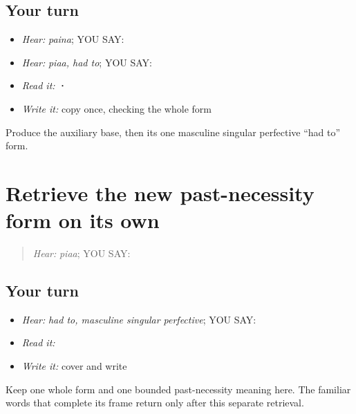 \subsection*{Your turn}
\begin{itemize}
\raggedright
  \item \emph{Hear:} \emph{paina}; YOU SAY: \textbf{}
  \item \emph{Hear:} \emph{piaa, had to}; YOU SAY: \textbf{}
  \item \emph{Read it:} \textbf{ · }
  \item \emph{Write it:} copy \textbf{} once, checking the whole form
\end{itemize}

\begin{tcolorbox}[breakable,colback=teal!4,colframe=teal!35!black,title={Before you move on}]
Produce the auxiliary base, then its one masculine singular perfective “had to” form.
\end{tcolorbox}
\section[\texorpdfstring{\pa{ਪਿਆ} (piaa)}{ਪਿਆ (piaa)}]{Retrieve the new past-necessity form on its own}

\label{lesson:PA-C208-pia-review}



\begin{quote}
\emph{Hear:} \emph{piaa}; YOU SAY: \textbf{}
\end{quote}

\subsection*{Your turn}
\begin{itemize}
\raggedright
  \item \emph{Hear:} \emph{had to, masculine singular perfective}; YOU SAY: \textbf{}
  \item \emph{Read it:} \textbf{}
  \item \emph{Write it:} cover and write \textbf{}
\end{itemize}

\begin{grammarlens}[title={Grammar Lens}]
Keep one whole form and one bounded past-necessity meaning here. The familiar words that complete its frame return only after this separate retrieval.
\end{grammarlens}

